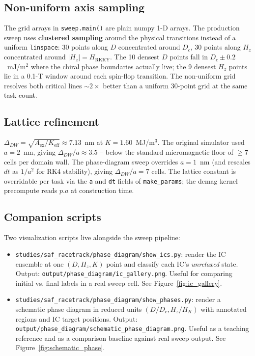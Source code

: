 \documentclass[11pt,a4paper]{article}
\newcommand{\Keff}{K_{\text{eff}}}
\newcommand{\Aex}{A_{\text{ex}}}
\newcommand{\HK}{H_K}
\newcommand{\Dc}{D_c}
\newcommand{\HRKKY}{H_{\text{RKKY}}}
\begin{document}
\subsection{Non-uniform axis sampling}

The grid arrays in \texttt{sweep.main()} are plain numpy
1-D arrays. The production sweep uses
\textbf{clustered sampling} around the physical
transitions instead of a uniform \texttt{linspace}: 30
points along $D$ concentrated around $\Dc$, 30 points
along $H_z$ concentrated around $|H_z| = \HRKKY$. The 10
densest $D$ points fall in $\Dc \pm 0.2$~mJ/m$^2$ where
the chiral phase boundaries actually live; the 9 densest
$H_z$ points lie in a 0.1-T window around each spin-flop
transition. The non-uniform grid resolves both critical
lines $\sim 2\times$ better than a uniform 30-point grid
at the same task count.

\subsection{Lattice refinement}

$\Delta_{DW} = \sqrt{\Aex / \Keff} \approx 7.13$~nm at
$K = 1.60$~MJ/m$^3$. The original simulator used
$a = 2$~nm, giving $\Delta_{DW} / a \approx 3.5$ -- below
the standard micromagnetic floor of $\ge 7$ cells per
domain wall. The phase-diagram sweep overrides $a = 1$~nm
(and rescales $dt$ as $1/a^2$ for RK4 stability), giving
$\Delta_{DW} / a = 7$ cells. The lattice constant is
overridable per task via the \texttt{a} and \texttt{dt}
fields of \texttt{make\_params}; the demag kernel
precompute reads $p.a$ at construction time.

\subsection{Companion scripts}

Two visualization scripts live alongside the sweep
pipeline:
%
\begin{itemize}[nosep]
\item \texttt{studies/saf\_racetrack/phase\_diagram/show\_ics.py}: render the
    IC ensemble at one $(D, H_z, K)$ point and classify
    each IC's \emph{unrelaxed} state. Output:
    \texttt{output/phase\_diagram/ic\_gallery.png}.
    Useful for comparing initial vs. final labels in a
    real sweep cell. See Figure~\ref{fig:ic_gallery}.
\item \texttt{studies/saf\_racetrack/phase\_diagram/show\_phases.py}: render
    a schematic phase diagram in reduced units
    $(D/\Dc, H_z/\HK)$ with annotated regions and IC
    target positions. Output:
    \texttt{output/phase\_diagram/schematic\_phase\_diagram.png}.
    Useful as a teaching reference and as a comparison
    baseline against real sweep output. See
    Figure~\ref{fig:schematic_phase}.
\end{itemize}
\end{document}
